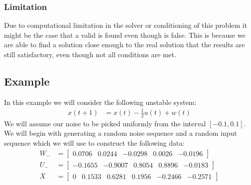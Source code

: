 \subsubsection*{Limitation}
Due to computational limitation in the solver or conditioning of this problem it might be the case that a valid  is found even though  is false. This is because we are able to find a solution close enough to the real solution that the results are still satisfactory, even though not all conditions are met. 

\subsection{Example} \label{ExampleQS}
In this example we will consider the following unstable system:
\begin{align*}
	x(t+1) &= x(t) - \frac{1}{2}u(t) + w(t) 
\end{align*}
We will assume our noise to be picked uniformly from the interval $[-0.1 , 0.1]$. We will begin with generating a random noise sequence and a random input sequence which we will use to construct the following data:
\begin{align*}
	W_- &= \begin{bmatrix}  0.0706 &  0.0244 & -0.0298 & 0.0026 & -0.0196 \end{bmatrix} \\
	U_- &= \begin{bmatrix} -0.1655 & -0.9007 &  0.8054 & 0.8896 & -0.0183 \end{bmatrix} \\
	X   &= \begin{bmatrix}     0   &  0.1533 &  0.6281 & 0.1956 & -0.2466 & -0.2571 \end{bmatrix} \\
\end{align*}

